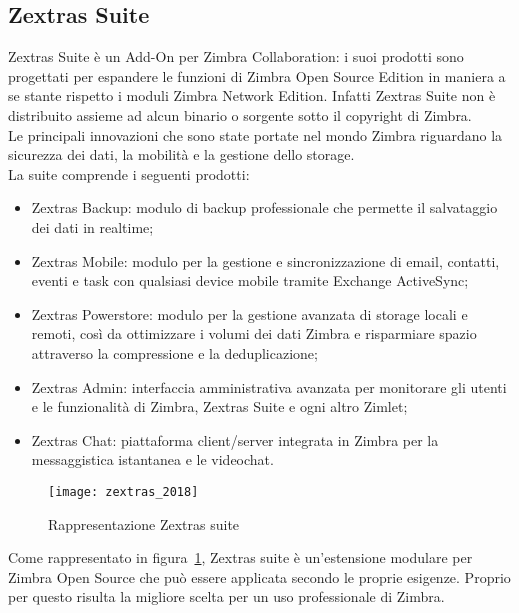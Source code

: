 \subsection{Zextras Suite} \label{subsec:Zextras}
Zextras Suite è un Add-On per Zimbra Collaboration: i suoi prodotti sono progettati per espandere le funzioni di Zimbra Open Source Edition in maniera a se stante rispetto i moduli Zimbra Network Edition. Infatti Zextras Suite non è distribuito assieme ad alcun binario o sorgente sotto il copyright di Zimbra. \\
Le principali innovazioni che sono state portate nel mondo Zimbra riguardano la sicurezza dei dati, la mobilità e la gestione dello storage.\\
La suite comprende i seguenti prodotti:
	\begin{itemize}
		\item Zextras Backup: modulo di backup professionale che permette il salvataggio dei dati in realtime;
		\item Zextras Mobile: modulo per la gestione e sincronizzazione di email, contatti, eventi e task con qualsiasi device mobile tramite Exchange ActiveSync;
		\item Zextras Powerstore: modulo per la gestione avanzata di storage locali e remoti, così da ottimizzare i volumi dei dati Zimbra e risparmiare spazio attraverso la compressione e la deduplicazione;
		\item Zextras Admin: interfaccia amministrativa avanzata per monitorare gli utenti e le funzionalità di Zimbra, Zextras Suite e ogni altro Zimlet;
		\item Zextras Chat: piattaforma client/server integrata in Zimbra per la messaggistica istantanea e le videochat.
	\end{itemize}

\begin{figure}[H] 
	\centering
	\texttt{[image: zextras\_2018]}
	\caption{Rappresentazione Zextras suite}
	\label{fig:modulizextras}
\end{figure}
Come rappresentato in figura~\ref{fig:modulizextras}, Zextras suite è un'estensione modulare per Zimbra Open Source che può essere applicata secondo le proprie esigenze. Proprio per questo risulta la migliore scelta per un uso professionale di Zimbra.

